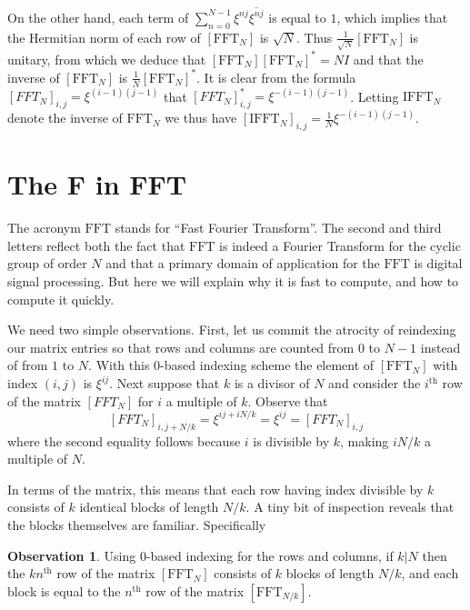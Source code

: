 \documentclass[12pt, letter, oneside]{amsart}
\theoremstyle{definition}
\newtheorem{observation}[para]{Observation}
\theoremstyle{plain}
\numberwithin{equation}{para}
\numberwithin{figure}{section}
\newcommand{\FFT}{\text{FFT}}
\newcommand{\IFFT}{\text{IFFT}}
\renewcommand{\th}{\text{th}}
\begin{document}
On the other hand, each term of
$\sum_{n=0}^{N-1} \xi^{nj}\overline{\xi^{nj}}$ is equal to $1$, which
implies that the Hermitian norm of each row of $[\FFT_N]$ is
$\sqrt{N}$.  Thus $\frac{1}{\sqrt{N}}[\FFT_N]$ is unitary, from which
we deduce that $[\FFT_N][\FFT_N]^* = NI$ and that the inverse of
$[\FFT_N]$ is $\frac{1}{N}[\FFT_N]^*$.  It is clear from the formula
$[FFT_N]_{i, j} = \xi^{(i-1)(j-1)}$ that $[FFT_N]^*_{i, j} = \xi^{-(i-1)(j-1)}$.
Letting $\IFFT_N$ denote the inverse of $\FFT_N$ we thus have
$[\IFFT_N]_{i, j} = \frac{1}{N}\xi^{-(i-1)(j-1)}$.

\section{The F in FFT}

The acronym $\FFT$ stands for ``Fast Fourier Transform''.  The second and
third letters reflect both the fact that $\FFT$ is indeed a Fourier Transform
for the cyclic group of order $N$ and that a primary domain of application
for the $\FFT$ is digital signal processing.  But here we will explain why
it is fast to compute, and how to compute it quickly.

We need two simple observations.  First, let us commit the atrocity of
reindexing our matrix entries so that rows and columns are counted
from $0$ to $N-1$ instead of from $1$ to $N$.  With this $0$-based
indexing scheme the element of $[\FFT_N]$ with index $(i,j)$ is
$\xi^{ij}$.  Next suppose that $k$ is a divisor of $N$ and consider
the $i^\th$ row of the matrix $[FFT_N]$ for $i$ a multiple of $k$.
Observe that
$$[FFT_N]_{i,j+N/k} = \xi^{ij + iN/k} = \xi^{ij} = [FFT_N]_{i,j}$$
where the second equality follows because $i$ is divisible by $k$, making
$iN/k$ a multiple of $N$.

In terms of the matrix, this means that each row having index divisible
by $k$ consists of $k$ identical blocks of length $N/k$.  A tiny bit of
inspection reveals that the blocks themselves are familiar.  Specifically

\begin{observation}\label{observation:block}
Using $0$-based indexing for the rows and columns, if $k|N$ then the
$kn^\th$ row of the matrix $[\FFT_N]$ consists of $k$ blocks of length
$N/k$, and each block is equal to the $n^\th$ row of the matrix
$[\FFT_{N/k}]$.
\end{observation}
\end{document}
